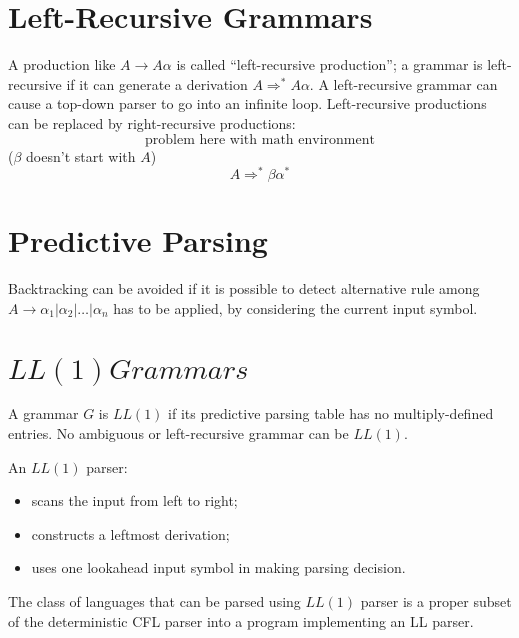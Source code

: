 \section{Left-Recursive Grammars}
A production like $A \to A\alpha$ is called ``left-recursive production''; a grammar is left-recursive if it can generate a derivation $A \Rightarrow^\ast A\alpha$.
A left-recursive grammar can cause a top-down parser to go into an infinite loop.
Left-recursive productions can be replaced by right-recursive productions:
$$
\text{problem here with math environment}
$$
($\beta$ doesn't start with $A$)
$$
    A \Rightarrow^\ast \beta\alpha^\ast
$$

\section{Predictive Parsing}
Backtracking can be avoided if it is possible to detect alternative rule among $A \to \alpha_1 | \alpha_2 | \ldots | \alpha_n$ has to be applied, by considering the current input symbol.

\section{$LL(1) Grammars$}
A grammar $G$ is $LL(1)$ if its predictive parsing table has no multiply-defined entries.
No ambiguous or left-recursive grammar can be $LL(1)$.

An $LL(1)$ parser:
\begin{itemize}
    \item scans the input from left to right;
    \item constructs a leftmost derivation;
    \item uses one lookahead input symbol in making parsing decision.
\end{itemize}

The class of languages that can be parsed using $LL(1)$ parser is a proper subset of the deterministic CFL parser into a program implementing an LL parser.